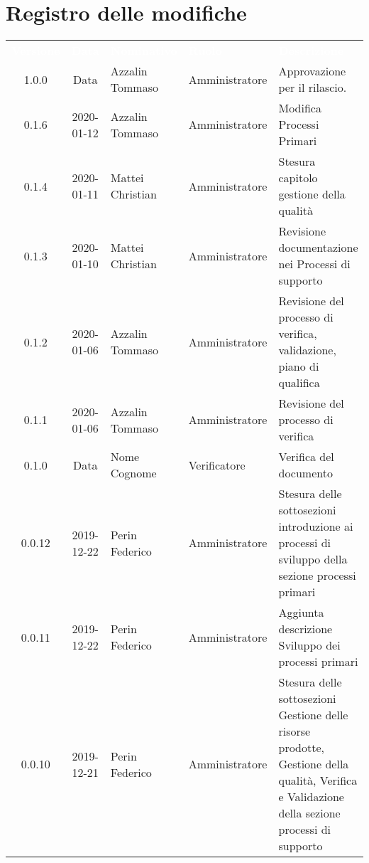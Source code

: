 \section*{Registro delle modifiche}
{
\renewcommand{\arraystretch}{1.5}
\centering
\begin{longtable}{c c  C{4cm}  C{3cm} C{4cm}}
\textcolor{white}{\textbf{Versione}} & \textcolor{white}{\textbf{Data}} & \textcolor{white}{\textbf{Nominativo}} & \textcolor{white}{\textbf{Ruolo}} & \textcolor{white}{\textbf{Descrizione}}\\	


1.0.0 & Data & Azzalin Tommaso & Amministratore & Approvazione per il rilascio.  \\

0.1.6 & 2020-01-12 & Azzalin Tommaso & Amministratore & Modifica Processi Primari \\

0.1.4 & 2020-01-11 & Mattei Christian & Amministratore & Stesura capitolo gestione della qualità \\

0.1.3 & 2020-01-10 & Mattei Christian & Amministratore & Revisione documentazione nei Processi di supporto \\

0.1.2 & 2020-01-06 & Azzalin Tommaso & Amministratore & Revisione del processo di verifica, validazione, piano di qualifica \\

0.1.1 & 2020-01-06 & Azzalin Tommaso & Amministratore & Revisione del processo di verifica \\

0.1.0 & Data & Nome Cognome & Verificatore & Verifica del documento \\

0.0.12 & 2019-12-22 & Perin Federico & Amministratore & Stesura delle sottosezioni introduzione ai processi di sviluppo della sezione processi primari\\

0.0.11 & 2019-12-22 & Perin Federico  & Amministratore & Aggiunta descrizione Sviluppo dei processi primari \\

0.0.10 & 2019-12-21 & Perin Federico & Amministratore & Stesura delle sottosezioni Gestione delle risorse prodotte, Gestione della qualità, Verifica e Validazione della sezione processi di supporto \\


\end{longtable}}
